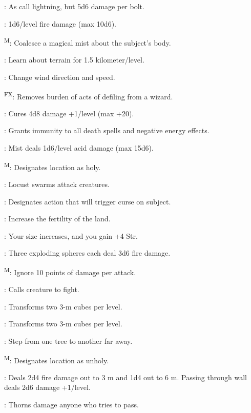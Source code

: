 : As call lightning, but 5d6 damage per bolt.

: 1d6/level fire damage (max 10d6).

\textsuperscript{M}: Coalesce a magical mist about the subject's body.

: Learn about terrain for 1.5 kilometer/level.

: Change wind direction and speed.

\textsuperscript{FX}: Removes burden of acts of defiling from a wizard.

: Cures 4d8 damage +1/level (max +20).

: Grants immunity to all death spells and negative energy effects.

: Mist deals 1d6/level acid damage (max 15d6).

\textsuperscript{M}: Designates location as holy.

: Locust swarms attack creatures.

: Designates action that will trigger curse on subject.

: Increase the fertility of the land.

: Your size increases, and you gain +4 Str.

: Three exploding spheres each deal 3d6 fire damage.

\textsuperscript{M}: Ignore 10 points of damage per attack.

: Calls creature to fight.

: Transforms two 3-m cubes per level.

: Transforms two 3-m cubes per level.

: Step from one tree to another far away.

\textsuperscript{M}: Designates location as unholy.

: Deals 2d4 fire damage out to 3 m and 1d4 out to 6 m. Passing through wall deals 2d6 damage +1/level.

: Thorns damage anyone who tries to pass.



